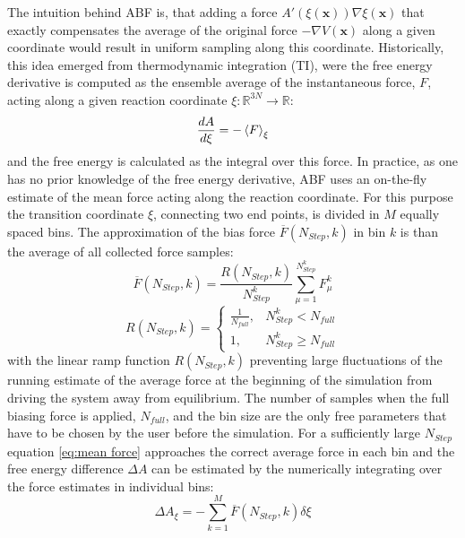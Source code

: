 The intuition behind ABF is, that adding a force $A'(\xi(\textbf{x}))\nabla \xi(\textbf{x})$ that exactly compensates the average of the original force $-\nabla V(\textbf{x})$ along a given coordinate would result in uniform sampling along this coordinate.\autocite{comer2015adaptive}
Historically, this idea emerged from thermodynamic integration (TI), were the free energy derivative  is computed as the ensemble average of the instantaneous force, $F$, acting along a given reaction coordinate $\xi: \mathbb{R} ^{3N} \to \mathbb{R}$:
\begin{equation}
\frac{dA}{d\xi} = -\braket{F}_{\xi}
\end{equation}
and the free energy is calculated as the integral over this force.\autocite{kirkwood1935statistical,zwanzig1954high}
In practice, as one has no prior knowledge of the free energy derivative, ABF uses an on-the-fly estimate of the mean force acting along the reaction coordinate. For this purpose the transition coordinate $\xi$, connecting two end points, is divided in $M$ equally spaced bins. The approximation of the bias force $\overline{F}(N_{Step},k)$ in bin $k$ is than the average of all collected force samples:\autocite{comer2015adaptive}
\begin{equation}
  \overline{F}(N_{Step},k) = \frac{R(N_{Step},k)}{N_{Step}^{k}} \sum_{\mu=1}^{N_{Step}^{k}} F_{\mu}^{k}
  \label{eq:mean force}
\end{equation}
\begin{equation}
  R(N_{Step},k)=\left\{\begin{array}{ll} \frac{1}{N_{full}}, & N_{Step}^{k} < N_{full} \\
                                         1,          & N_{Step}^{k} \geq  N_{full} \end{array}\right. \label{eq:ramp}
\end{equation}
with the linear ramp function $R(N_{Step},k)$ preventing large fluctuations of the running estimate of the average force at the beginning of the simulation from driving the system away from equilibrium. The number of samples when the full biasing force is applied, $N_{full}$, and the bin size are the only free parameters that have to be chosen by the user before the simulation. For a sufficiently large $N_{Step}$ equation \ref{eq:mean force} approaches the correct average force in each bin and the free energy difference $\Delta A$ can be estimated by the numerically integrating over the force estimates in individual bins:\autocite{comer2015adaptive}
\begin{equation}
  \Delta A_{\xi} = - \sum_{k=1}^{M} \overline{F}(N_{Step},k) \delta \xi
\end{equation}

